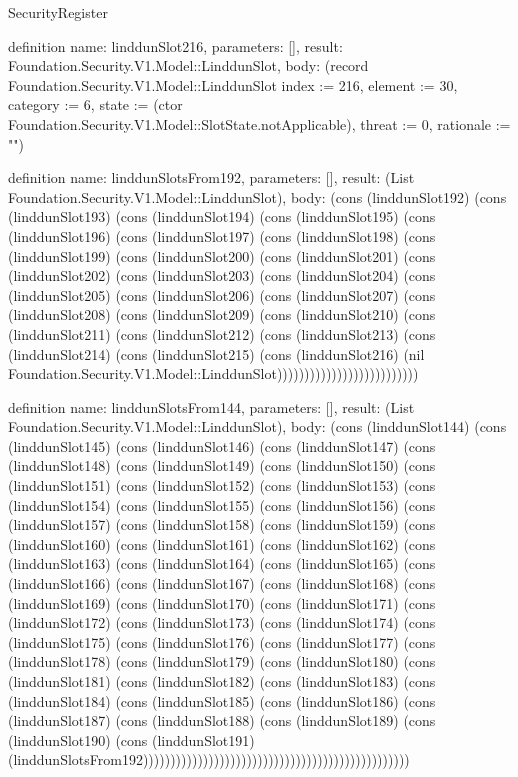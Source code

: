 \begin{lexlean}{SecurityRegister}
\begin{semanticmodule}
definition{
  name: linddunSlot216,
  parameters: [],
  result: Foundation.Security.V1.Model::LinddunSlot,
  body: (record Foundation.Security.V1.Model::LinddunSlot {index := 216, element := 30, category := 6, state := (ctor Foundation.Security.V1.Model::SlotState.notApplicable), threat := 0, rationale := ""})
}

definition{
  name: linddunSlotsFrom192,
  parameters: [],
  result: (List Foundation.Security.V1.Model::LinddunSlot),
  body: (cons (linddunSlot192) (cons (linddunSlot193) (cons (linddunSlot194) (cons (linddunSlot195) (cons (linddunSlot196) (cons (linddunSlot197) (cons (linddunSlot198) (cons (linddunSlot199) (cons (linddunSlot200) (cons (linddunSlot201) (cons (linddunSlot202) (cons (linddunSlot203) (cons (linddunSlot204) (cons (linddunSlot205) (cons (linddunSlot206) (cons (linddunSlot207) (cons (linddunSlot208) (cons (linddunSlot209) (cons (linddunSlot210) (cons (linddunSlot211) (cons (linddunSlot212) (cons (linddunSlot213) (cons (linddunSlot214) (cons (linddunSlot215) (cons (linddunSlot216) (nil Foundation.Security.V1.Model::LinddunSlot))))))))))))))))))))))))))
}

definition{
  name: linddunSlotsFrom144,
  parameters: [],
  result: (List Foundation.Security.V1.Model::LinddunSlot),
  body: (cons (linddunSlot144) (cons (linddunSlot145) (cons (linddunSlot146) (cons (linddunSlot147) (cons (linddunSlot148) (cons (linddunSlot149) (cons (linddunSlot150) (cons (linddunSlot151) (cons (linddunSlot152) (cons (linddunSlot153) (cons (linddunSlot154) (cons (linddunSlot155) (cons (linddunSlot156) (cons (linddunSlot157) (cons (linddunSlot158) (cons (linddunSlot159) (cons (linddunSlot160) (cons (linddunSlot161) (cons (linddunSlot162) (cons (linddunSlot163) (cons (linddunSlot164) (cons (linddunSlot165) (cons (linddunSlot166) (cons (linddunSlot167) (cons (linddunSlot168) (cons (linddunSlot169) (cons (linddunSlot170) (cons (linddunSlot171) (cons (linddunSlot172) (cons (linddunSlot173) (cons (linddunSlot174) (cons (linddunSlot175) (cons (linddunSlot176) (cons (linddunSlot177) (cons (linddunSlot178) (cons (linddunSlot179) (cons (linddunSlot180) (cons (linddunSlot181) (cons (linddunSlot182) (cons (linddunSlot183) (cons (linddunSlot184) (cons (linddunSlot185) (cons (linddunSlot186) (cons (linddunSlot187) (cons (linddunSlot188) (cons (linddunSlot189) (cons (linddunSlot190) (cons (linddunSlot191) (linddunSlotsFrom192)))))))))))))))))))))))))))))))))))))))))))))))))
}


\end{semanticmodule}
\end{lexlean}
